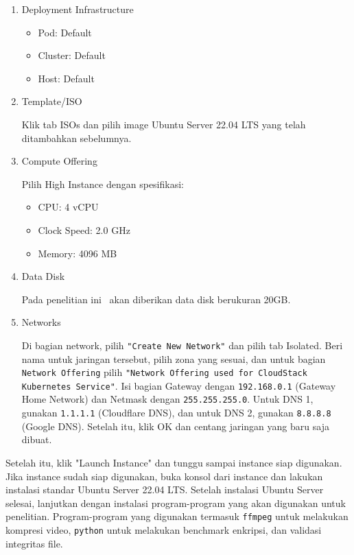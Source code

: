 \begin{enumerate}
    \item Deployment Infrastructure
          \begin{itemize}
              \item Pod: Default
              \item Cluster: Default
              \item Host: Default
          \end{itemize}

    \item Template/ISO

          Klik tab ISOs dan pilih image Ubuntu Server 22.04 LTS yang telah ditambahkan sebelumnya.

    \item Compute Offering

          Pilih High Instance dengan spesifikasi:
          \begin{itemize}
              \item CPU: 4 vCPU
              \item Clock Speed: 2.0 GHz
              \item Memory: 4096 MB
          \end{itemize}

    \item Data Disk

          Pada penelitian ini \vm\ akan diberikan data disk berukuran 20GB.

    \item Networks

          Di bagian network, pilih \texttt{"Create New Network"} dan pilih tab Isolated. Beri nama untuk jaringan tersebut, pilih zona yang sesuai, dan untuk bagian \texttt{Network Offering} pilih \texttt{"Network Offering used for CloudStack Kubernetes Service"}. Isi bagian Gateway dengan \texttt{192.168.0.1} (Gateway Home Network) dan Netmask dengan \texttt{255.255.255.0}. Untuk DNS 1, gunakan \texttt{1.1.1.1} (Cloudflare DNS), dan untuk DNS 2, gunakan \texttt{8.8.8.8} (Google DNS). Setelah itu, klik OK dan centang jaringan yang baru saja dibuat.
\end{enumerate}

Setelah itu, klik "Launch Instance" dan tunggu sampai instance siap digunakan. Jika instance sudah siap digunakan, buka konsol dari instance dan lakukan instalasi standar Ubuntu Server 22.04 LTS. Setelah instalasi Ubuntu Server selesai, lanjutkan dengan instalasi program-program yang akan digunakan untuk penelitian. Program-program yang digunakan termasuk \texttt{ffmpeg} untuk melakukan kompresi video, \texttt{python} untuk melakukan benchmark enkripsi, dan validasi integritas file.

